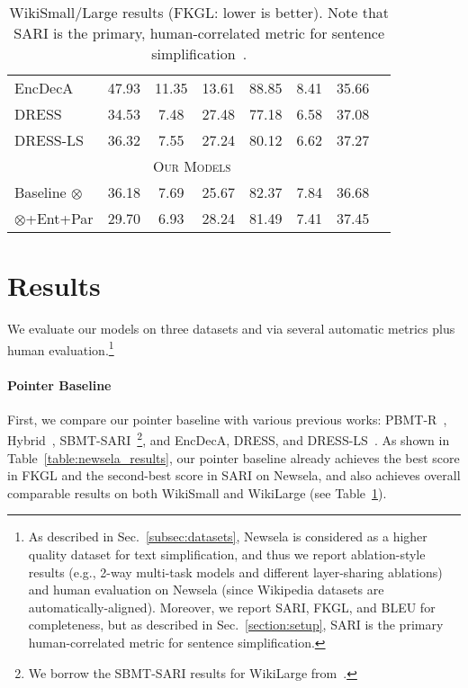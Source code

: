 \documentclass[11pt]{article}
\begin{document}
\begin{table}[t]
\begin{minipage}[t]{.595\linewidth}
\begin{center}
\begin{small}
\begin{tabular}{|l|c|c|c|c|c|c|c|}
EncDecA  & 47.93 & 11.35 & 13.61 & 88.85 & 8.41 & 35.66 \\
DRESS  & 34.53 & 7.48 & 27.48 & 77.18 & 6.58 & 37.08 \\
DRESS-LS  & 36.32 & 7.55 & 27.24 & 80.12 & 6.62 & 37.27 \\
\hline
\multicolumn{7}{|c|}{\textsc{Our Models}}\\
\hline
Baseline $\otimes$  & 36.18 & 7.69 & 25.67 & 82.37 & 7.84 & 36.68 \\
$\otimes$+Ent+Par  & 29.70 & 6.93 & 28.24 & 81.49 & 7.41 & 37.45 \\
\hline
\end{tabular}
\end{small}
\end{center}
\vspace{-8pt}
\caption{WikiSmall/Large results (FKGL: lower is better). Note that SARI is the primary, human-correlated metric for sentence simplification~\cite{Xu2016OptimizingSM}.
}
\label{table:wikilarge_results}
\end{minipage}
\vspace{-5pt}
\end{table}


\section{Results}
\label{label:results}
We evaluate our models on three datasets and via several automatic metrics plus human evaluation.\footnote{As described in Sec.~\ref{subsec:datasets}, Newsela is considered as a higher quality dataset for text simplification, and thus we report ablation-style results (e.g., 2-way multi-task models and different layer-sharing ablations) and human evaluation on Newsela (since Wikipedia datasets are automatically-aligned). Moreover, we report SARI, FKGL, and BLEU for completeness, but as described in Sec.~\ref{section:setup}, SARI is the primary human-correlated metric for sentence simplification.} 

\paragraph{Pointer Baseline}
First, we compare our pointer baseline with various previous works: PBMT-R~\cite{Wubben2012SentenceSB}, Hybrid~\cite{Narayan2014HybridSU}, SBMT-SARI~\cite{Xu2016OptimizingSM}\footnote{We borrow the SBMT-SARI results for WikiLarge from~.}, and EncDecA, DRESS, and DRESS-LS~\cite{zhang2017dress}. As shown in Table~\ref{table:newsela_results}, our pointer baseline already achieves the best score in FKGL and the second-best score in SARI on Newsela, and also achieves overall comparable results on both WikiSmall and WikiLarge (see Table~\ref{table:wikilarge_results}).
\end{document}
